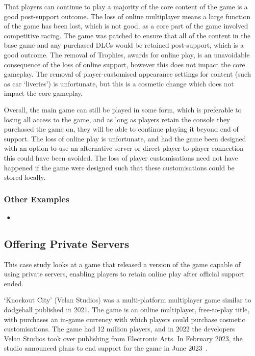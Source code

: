 That players can continue to play a majority of the core content of the game is a good post-support outcome.
The loss of online multiplayer means a large function of the game has been lost, which is not good, as a core part of the game involved competitive racing.
The game was patched to ensure that all of the content in the base game and any purchased DLCs would be retained post-support, which is a good outcome.
The removal of Trophies, awards for online play, is an unavoidable consequence of the loss of online support, however this does not impact the core gameplay.
The removal of player-customised appearance settings for content (such as car `liveries') is unfortunate, but this is a cosmetic change which does not impact the core gameplay.

Overall, the main game can still be played in some form, which is preferable to losing all access to the game,
and as long as players retain the console they purchased the game on, they will be able to continue playing it beyond end of support.
The loss of online play is unfortunate, and had the game been designed with an option to use an alternative server or direct player-to-player connection this could have been avoided.
The loss of player customisations need not have happened if the game were designed such that these customisations could be stored locally.

\subsubsection*{Other Examples}
\begin{itemize}
    \item
\end{itemize}

\subsection{Offering Private Servers}
This case study looks at a game that released a version of the game capable of using private servers,
enabling players to retain online play after official support ended.

`Knockout City' (Velan Studios) was a multi-platform multiplayer game similar to dodgeball published in 2021.
The game is an online multiplayer, free-to-play title, with purchases an in-game currency with which players could purchase cosmetic customisations.
The game had 12 million players\cite{knockout-stats}, and in 2022 the developers Velan Studios took over publishing from Electronic Arts.
In February 2023, the studio announced plans to end support for the game in June 2023~\cite{knockout-eos-2023}.

